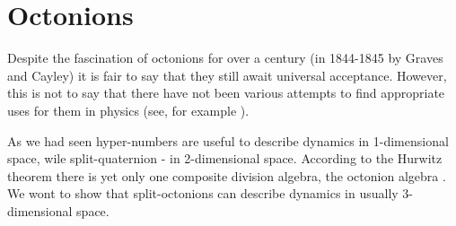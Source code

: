 \documentclass[a4paper,12pt]{article}
\begin{document}

\section{Octonions}

Despite the fascination of octonions for over a century (in 1844-1845 by Graves and Cayley) 
it is fair to say that they still await universal acceptance. However, this is not to say 
that there have not been various attempts to find appropriate uses for them in physics 
(see, for example \cite{SoLo,Qua,Oct,Ku}). 

As we had seen hyper-numbers are useful to describe dynamics in 1-dimensional space, 
wile split-quaternion - in 2-dimensional space. According to the Hurwitz theorem there 
is yet only one composite division algebra, the octonion algebra \cite{Sc}. We wont to 
show that split-octonions can describe dynamics in usually 3-dimensional space.
\end{document}
